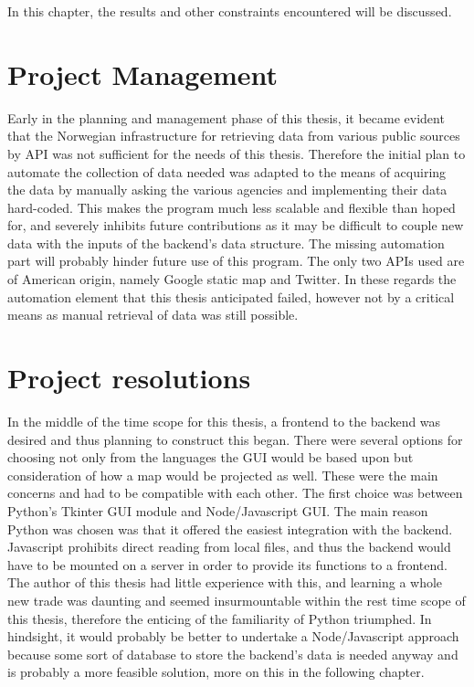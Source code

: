 
In this chapter, the results and other constraints encountered will be discussed.

\section{Project Management}

Early in the planning and management phase of this thesis, it became evident that the Norwegian infrastructure for retrieving data from various public sources by API was not sufficient for the needs of this thesis. Therefore the initial plan to automate the collection of data needed was adapted to the means of acquiring the data by manually asking the various agencies and implementing their data hard-coded. This makes the program much less scalable and flexible than hoped for, and severely inhibits future contributions as it may be difficult to couple new data with the inputs of the backend's data structure. The missing automation part will probably hinder future use of this program. The only two APIs used are of American origin, namely Google static map and Twitter. In these regards the automation element that this thesis anticipated failed, however not by a critical means as manual retrieval of data was still possible.






\section{Project resolutions}
In the middle of the time scope for this thesis, a frontend to the backend was desired and thus planning to construct this began. There were several options for choosing not only from the languages the GUI would be based upon but consideration of how a map would be projected as well. These were the main concerns and had to be compatible with each other. The first choice was between Python's Tkinter GUI module and Node/Javascript GUI. The main reason Python was chosen was that it offered the easiest integration with the backend. Javascript prohibits direct reading from local files, and thus the backend would have to be mounted on a server in order to provide its functions to a frontend. The author of this thesis had little experience with this, and learning a whole new trade was daunting and seemed insurmountable within the rest time scope of this thesis, therefore the enticing of the familiarity of Python triumphed. In hindsight, it would probably be better to undertake a Node/Javascript approach because some sort of database to store the backend's data is needed anyway and is probably a more feasible solution, more on this in the following chapter.

